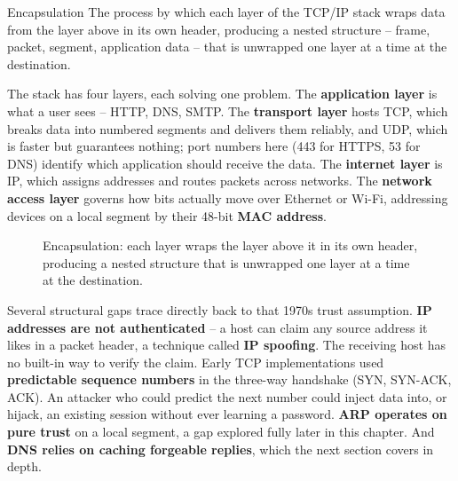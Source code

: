\begin{definition}{Encapsulation}
The process by which each layer of the TCP/IP stack wraps data from the layer above in its own
header, producing a nested structure -- frame, packet, segment, application data -- that is
unwrapped one layer at a time at the destination.
\end{definition}

The stack has four layers, each solving one problem. The \textbf{application layer} is what a user
sees -- HTTP, DNS, SMTP. The \textbf{transport layer} hosts TCP, which breaks data into numbered
segments and delivers them reliably, and UDP, which is faster but guarantees nothing; port numbers
here (443 for HTTPS, 53 for DNS) identify which application should receive the data. The
\textbf{internet layer} is IP, which assigns addresses and routes packets across networks. The
\textbf{network access layer} governs how bits actually move over Ethernet or Wi-Fi, addressing
devices on a local segment by their 48-bit \textbf{MAC address}.

\begin{figure}[h]
\centering
{}
\caption{Encapsulation: each layer wraps the layer above it in its own header, producing a nested
structure that is unwrapped one layer at a time at the destination.}
\label{fig:3.1-encapsulation}
\end{figure}

Several structural gaps trace directly back to that 1970s trust assumption. \textbf{IP addresses
are not authenticated} -- a host can claim any source address it likes in a packet header, a
technique called \textbf{IP spoofing}. The receiving host has no built-in way to verify the
claim. Early TCP implementations used \textbf{predictable sequence numbers} in the three-way
handshake (SYN, SYN-ACK, ACK). An attacker who could predict the next number could
inject data into, or hijack, an existing session without ever learning a password. \textbf{ARP operates on pure
trust} on a local segment, a gap explored fully later in this chapter. And \textbf{DNS relies on
caching forgeable replies}, which the next section covers in depth.

